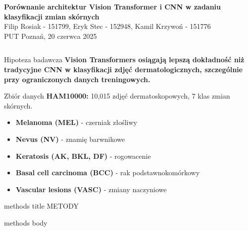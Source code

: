 \documentclass[final]{beamer}
\begin{document}
\begin{frame}[t]
 
    \vspace{0.2cm}
    \begin{center}
    {\color{headercolor}\Huge\textbf{Porównanie architektur Vision Transformer i CNN w zadaniu klasyfikacji zmian skórnych}}\\[0.3cm]
    {\Large Filip Rosiak - 151799, Eryk Stec - 152948, Kamil Krzywoń - 151776}\\[0.2cm]
    {\large PUT Poznań, 20 czerwca 2025}
\end{center}
    \vspace{0.2cm}

    \begin{columns}[T]
        \begin{column}{.48\linewidth}
            \begin{block}{Hipoteza badawcza}
                \large\textbf{Vision Transformers osiągają lepszą dokładność niż tradycyjne CNN w klasyfikacji zdjęć dermatologicznych, szczególnie przy ograniczonych danych treningowych.}
            \end{block}
            \vspace{0.15cm}
            
            \begin{block}{Zbiór danych}
                \textbf{HAM10000:} 10,015 zdjęć dermatoskopowych, 7 klas zmian skórnych.
                
                \vspace{0.15cm}
                \begin{itemize}
                    \item \textbf{Melanoma (MEL)} - czerniak złośliwy
                    \item \textbf{Nevus (NV)} - znamię barwnikowe
                    \item \textbf{Keratosis (AK, BKL, DF)} - rogowacenie
                    \item \textbf{Basal cell carcinoma (BCC)} - rak podstawnokomórkowy
                    \item \textbf{Vascular lesions (VASC)} - zmiany naczyniowe
                \end{itemize}
            \end{block}
            \vspace{0.15cm}
        
            {%
            \begin{beamercolorbox}[wd=\linewidth,center]{methods title}
                \large METODY
                \vspace{0.3cm}
            \end{beamercolorbox}}
            {%
            \begin{beamercolorbox}[wd=\linewidth,dp=0.3cm]{methods body}
                \vspace{0.15cm}
                

\end{beamercolorbox}}
\end{column}
\end{columns}
\end{frame}
\end{document}
